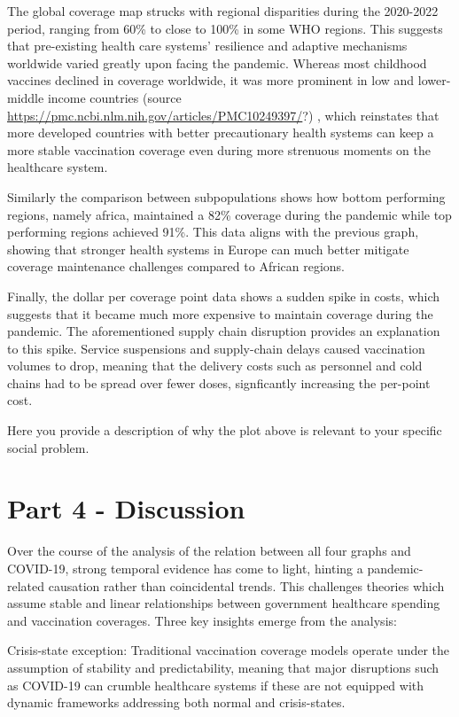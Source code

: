 \documentclass[
]{article}
\begin{document}
The global coverage map strucks with regional disparities during the
2020-2022 period, ranging from 60\% to close to 100\% in some WHO
regions. This suggests that pre-existing health care systems' resilience
and adaptive mechanisms worldwide varied greatly upon facing the
pandemic. Whereas most childhood vaccines declined in coverage
worldwide, it was more prominent in low and lower-middle income
countries (source
\url{https://pmc.ncbi.nlm.nih.gov/articles/PMC10249397/}?) , which
reinstates that more developed countries with better precautionary
health systems can keep a more stable vaccination coverage even during
more strenuous moments on the healthcare system.

Similarly the comparison between subpopulations shows how bottom
performing regions, namely africa, maintained a 82\% coverage during the
pandemic while top performing regions achieved 91\%. This data aligns
with the previous graph, showing that stronger health systems in Europe
can much better mitigate coverage maintenance challenges compared to
African regions.

Finally, the dollar per coverage point data shows a sudden spike in
costs, which suggests that it became much more expensive to maintain
coverage during the pandemic. The aforementioned supply chain disruption
provides an explanation to this spike. Service suspensions and
supply-chain delays caused vaccination volumes to drop, meaning that the
delivery costs such as personnel and cold chains had to be spread over
fewer doses, signficantly increasing the per-point cost.

Here you provide a description of why the plot above is relevant to your
specific social problem.

\section{Part 4 - Discussion}\label{part-4---discussion}

Over the course of the analysis of the relation between all four graphs
and COVID-19, strong temporal evidence has come to light, hinting a
pandemic-related causation rather than coincidental trends. This
challenges theories which assume stable and linear relationships between
government healthcare spending and vaccination coverages. Three key
insights emerge from the analysis:

Crisis-state exception: Traditional vaccination coverage models operate
under the assumption of stability and predictability, meaning that major
disruptions such as COVID-19 can crumble healthcare systems if these are
not equipped with dynamic frameworks addressing both normal and
crisis-states.
\end{document}
